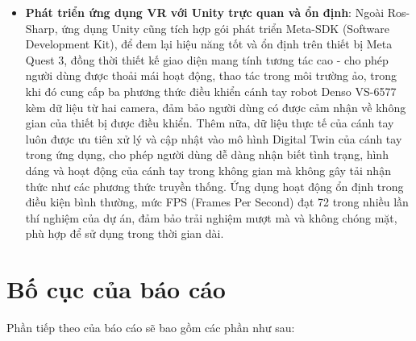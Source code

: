 \begin{itemize}
    \item \textbf{Phát triển ứng dụng VR với Unity trực quan và ổn định}: Ngoài Ros-Sharp, ứng dụng Unity cũng tích hợp gói phát triển Meta-SDK (Software Development Kit), để đem lại hiệu năng tốt và ổn định trên thiết bị Meta Quest 3, đồng thời thiết kế giao diện mang tính tương tác cao - cho phép người dùng được thoải mái hoạt động, thao tác trong môi trường ảo, trong khi đó cung cấp ba phương thức điều khiển cánh tay robot Denso VS-6577 kèm dữ liệu từ hai camera, đảm bảo người dùng có được cảm nhận về không gian của thiết bị được điều khiển. Thêm nữa, dữ liệu thực tế của cánh tay luôn được ưu tiên xử lý và cập nhật vào mô hình Digital Twin của cánh tay trong ứng dụng, cho phép người dùng dễ dàng nhận biết tình trạng, hình dáng và hoạt động của cánh tay trong không gian mà không gây tải nhận thức như các phương thức truyền thống. Ứng dụng hoạt động ổn định trong điều kiện bình thường, mức FPS (Frames Per Second) đạt 72 trong nhiều lần thí nghiệm của dự án, đảm bảo trải nghiệm mượt mà và không chóng mặt, phù hợp để sử dụng trong thời gian dài. 
\end{itemize}

\section{Bố cục của báo cáo}

Phần tiếp theo của báo cáo sẽ bao gồm các phần như sau:

